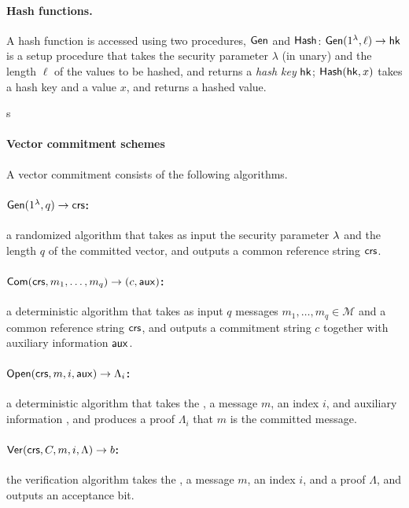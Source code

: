 \paragraph{Hash functions.}
A hash function is accessed using two procedures, $\mathsf{Gen}$ and $\mathsf{Hash}$:
$\mathsf{Gen}(1^\lambda, \ell)\rightarrow \mathsf{hk}$ is a setup procedure that takes the security parameter $\lambda$
(in unary) and the length $\ell$ of the values to be hashed, and returns a \emph{hash key} $\mathsf{hk}$;
$\mathsf{Hash}(\mathsf{hk}, x)$ takes a hash key and a value $x$, and returns a hashed value.

s
\paragraph{Vector commitment schemes}
A vector commitment consists of the following algorithms.

\paragraph{$\mathsf{Gen}(1^\lambda, q)\to \mathsf{crs}$:} a randomized algorithm that takes as input the security parameter $\lambda$ and the length $q$ of the committed vector, and outputs a common reference string $\mathsf{crs}$.
\paragraph{$\mathsf{Com}(\mathsf{crs}, m_1,\ldots , m_q)\to (c,\mathsf{aux})$:} a deterministic algorithm that takes as input $q$ messages $m_1,\ldots, m_q\in \mathcal{M}$ and a common reference string $\mathsf{crs}$, and outputs a commitment string $c$ together with auxiliary information $\mathsf{aux}$.
\paragraph{$\mathsf{Open}(\mathsf{crs}, m, i, \mathsf{aux})\to \Lambda_i$:} a deterministic algorithm that takes the \crs, a message $m$, an index $i$, and auxiliary information \aux, and produces a proof $\Lambda_i$ that $m$ is the \ith committed message.
\paragraph{$\mathsf{Ver}(\mathsf{crs}, C, m, i, \Lambda)\to b$:} the verification algorithm takes the \crs, a message $m$, an index $i$, and a proof $\Lambda$, and outputs an acceptance bit.
%


